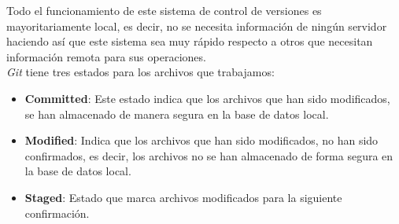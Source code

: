 Todo el funcionamiento de este sistema de control de versiones es mayoritariamente local, es decir, no se necesita información de ningún servidor haciendo así que este sistema sea muy rápido respecto a otros que necesitan información remota para sus operaciones. \\
\emph{Git} tiene tres estados para los archivos que trabajamos:
\begin{itemize}
    \item \textbf{Committed}: Este estado indica que los archivos que han sido modificados, se han almacenado de manera segura en la base de datos local.
    \item \textbf{Modified}: Indica que los archivos que han sido modificados, no han sido confirmados, es decir, los archivos no se han almacenado de forma segura en la base de datos local.
    \item \textbf{Staged}: Estado que marca archivos modificados para la siguiente confirmación.
\end{itemize} 

